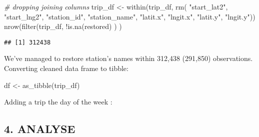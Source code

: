 \documentclass[
]{article}
\newenvironment{Shaded}{\begin{snugshade}}{\end{snugshade}}
\newcommand{\AttributeTok}[1]{\textcolor[rgb]{0.77,0.63,0.00}{#1}}
\newcommand{\CommentTok}[1]{\textcolor[rgb]{0.56,0.35,0.01}{\textit{#1}}}
\newcommand{\ConstantTok}[1]{\textcolor[rgb]{0.00,0.00,0.00}{#1}}
\newcommand{\FunctionTok}[1]{\textcolor[rgb]{0.00,0.00,0.00}{#1}}
\newcommand{\NormalTok}[1]{#1}
\newcommand{\OtherTok}[1]{\textcolor[rgb]{0.56,0.35,0.01}{#1}}
\newcommand{\SpecialCharTok}[1]{\textcolor[rgb]{0.00,0.00,0.00}{#1}}
\newcommand{\StringTok}[1]{\textcolor[rgb]{0.31,0.60,0.02}{#1}}
\begin{document}
\begin{Shaded}
\begin{Highlighting}[]
\CommentTok{\# dropping joining columns}
\NormalTok{trip\_df }\OtherTok{\textless{}{-}} \FunctionTok{within}\NormalTok{(trip\_df, }\FunctionTok{rm}\NormalTok{(}
                                  \StringTok{"start\_lat2"}\NormalTok{,}
                                  \StringTok{"start\_lng2"}\NormalTok{,}
                                  \StringTok{"station\_id"}\NormalTok{,}
                                  \StringTok{"station\_name"}\NormalTok{,}
                                  \StringTok{"latit.x"}\NormalTok{,}
                                  \StringTok{"lngit.x"}\NormalTok{,}
                                  \StringTok{"latit.y"}\NormalTok{,}
                                  \StringTok{"lngit.y"}\NormalTok{))}
\FunctionTok{nrow}\NormalTok{(}\FunctionTok{filter}\NormalTok{(trip\_df, }\SpecialCharTok{!}\FunctionTok{is.na}\NormalTok{(restored) ) )}
\end{Highlighting}
\end{Shaded}

\begin{verbatim}
## [1] 312438
\end{verbatim}

We've managed to restore station's names within 312,438 (291,850)
observations.\\

Converting cleaned data frame to tibble:

\begin{Shaded}
\begin{Highlighting}[]
\NormalTok{df }\OtherTok{\textless{}{-}} \FunctionTok{as\_tibble}\NormalTok{(trip\_df) }
\end{Highlighting}
\end{Shaded}

Adding a trip the day of the week :

\begin{Shaded}
\end{Shaded}

\hypertarget{analyse}{%
\subsection{4. ANALYSE}\label{analyse}}
\end{document}
